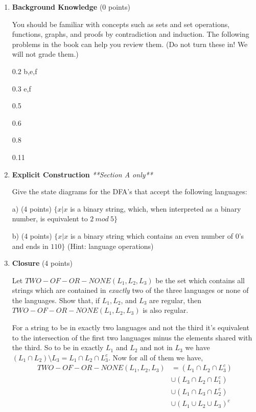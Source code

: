 \documentclass[11pt]{article}
\begin{document}
\begin{enumerate}
    \item[0.] \textbf{Background Knowledge} (0 points)
    
    You should be familiar with concepts such as sets and set operations, functions, graphs, and proofs by contradiction and induction. The following problems in the book can help you review them. (Do not turn these in! We will not grade them.)
    
    0.2 b,e,f
    
    0.3 e,f

    0.5

    0.6

    0.8

    0.11
    
    \item \textbf{Explicit Construction} \textit{**Section A only**} 
    
    Give the state diagrams for the DFA's that accept the following languages:
    
    a) (4 points) $\{x | x$ is a binary string, which, when interpreted as a binary number, is equivalent to  $2\ mod\ 5\}$

    \begin{answer}
        
    \end{answer}
    
    b) (4 points) $\{x | x$ is a binary string which contains an even number of $0$'s and ends in $110\}$ (Hint: language operations)

    \begin{answer}
        
    \end{answer}
    
    \item \textbf{Closure} (4 points) 
    
    Let $TWO-OF-OR-NONE(L_1, L_2, L_3)$ be the set which contains all strings which are contained in \emph{exactly} two of the three languages or none of the languages. Show that, if $L_1, L_2$, and $L_3$ are regular, then $TWO-OF-OR-NONE(L_1, L_2, L_3)$ is also regular. 

    \begin{answer}
        For a string to be in exactly two languages and not the third it's equivalent to the intersection of the first two languages minus the elements shared with the third. So to be in exactly $L_{1}$ and $L_{2}$ and not in $L_{3}$ we have $(L_{1}\cap L_{2}) \setminus L_{3} =L_{1}\cap L_{2} \cap L_{3}^{c}  $. Now for all of them we have, 
        \begin{align*}
            TWO-OF-OR-NONE(L_{1}, L_{2}, L_{3}) &= (L_{1} \cap L_{2} \cap  L_{3}^{c})\\
                                                &\cup (L_{3} \cap L_{2} \cap  L_{1}^{c})\\
                                                &\cup (L_{1} \cap L_{3} \cap  L_{2}^{c})\\
                                                &\cup (L_{1} \cup L_{2} \cup L_{3})^{c}
        \end{align*}


\end{answer}
\end{enumerate}
\end{document}
